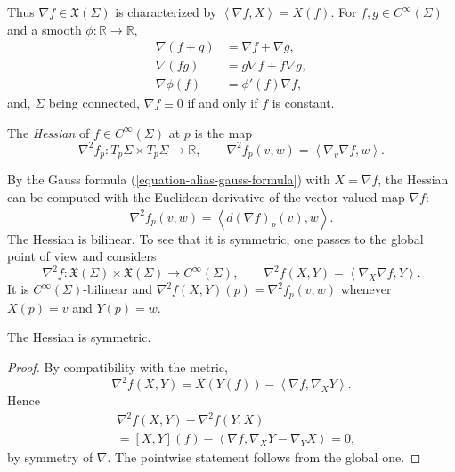 Thus $\nabla f\in\mathfrak{X}(\Sigma)$ is
characterized by $\left\langle{} \nabla
f,X\right\rangle{}=X(f)$. For
$f,g\in C^\infty(\Sigma)$ and a smooth
$\phi:\mathbb{R}\to\mathbb{R}$,
$$
\begin{aligned}
\nabla(f+g)&=\nabla f+\nabla g,\\
\nabla(fg)&=g\nabla f+f\nabla g,\\
\nabla\phi(f)&=\phi'(f)\nabla f,
\end{aligned}
$$
and, $\Sigma$ being connected,
$\nabla f\equiv 0$ if and only if $f$ is
constant.

\begin{definition}
\label{definition-alias-hessian}
The \emph{Hessian} of
$f\in C^\infty(\Sigma)$ at $p$ is the map
$$
\nabla^2f_p:
T_p\Sigma\times T_p\Sigma\to\mathbb{R},
\qquad
\nabla^2f_p(v,w)=\left\langle{}
\nabla_v\nabla f,w\right\rangle{}.
$$
\end{definition}

By the Gauss formula
(\ref{equation-alias-gauss-formula}) with
$X=\nabla f$, the Hessian can be computed
with the Euclidean derivative of the
vector valued map $\nabla f$:
\begin{equation}
\label{equation-alias-hessian-euclidean}
\nabla^2f_p(v,w)=\left\langle{}
d(\nabla f)_p(v),w\right\rangle{}.
\end{equation}
The Hessian is bilinear. To see that it
is symmetric, one passes to the global
point of view and considers
$$
\nabla^2f:
\mathfrak{X}(\Sigma)\times
\mathfrak{X}(\Sigma)\to C^\infty(\Sigma),
\qquad
\nabla^2f(X,Y)=\left\langle{}
\nabla_X\nabla f,Y\right\rangle{}.
$$
It is $C^\infty(\Sigma)$-bilinear and
$\nabla^2f(X,Y)(p)=\nabla^2f_p(v,w)$
whenever $X(p)=v$ and $Y(p)=w$.

\begin{lemma}
\label{lemma-alias-hessian-symmetric}
The Hessian is symmetric.
\end{lemma}

\begin{proof}
By compatibility with the metric,
$$
\nabla^2f(X,Y)
=X(Y(f))-\left\langle{} \nabla f,
\nabla_XY\right\rangle{}.
$$
Hence
$$
\begin{aligned}
&\nabla^2f(X,Y)-\nabla^2f(Y,X)\\
&=[X,Y](f)-\left\langle{} \nabla f,
\nabla_XY-\nabla_YX\right\rangle{}=0,
\end{aligned}
$$
by symmetry of $\nabla$. The pointwise
statement follows from the global one.
\end{proof}

